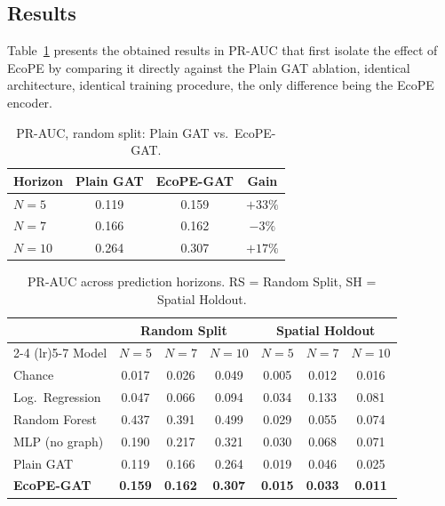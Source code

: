 \documentclass[a4paper,fleqn]{cas-sc}
\begin{document}
\subsection{Results}
\label{sec:results}

Table~\ref{tab:ecope-contribution} presents the obtained results in PR-AUC that first isolate the effect of EcoPE by comparing it directly against the Plain GAT ablation, identical architecture, identical training procedure, the only difference being the EcoPE encoder.

\begin{table}[t]
\centering
\caption{PR-AUC, random split: Plain GAT vs.\ EcoPE-GAT.}
\label{tab:ecope-contribution}
\begin{tabular}{lccc}
\toprule
Horizon & Plain GAT & EcoPE-GAT & Gain \\
\midrule
$N=5$  & 0.119 & 0.159 & $+33\%$ \\
$N=7$  & 0.166 & 0.162 & $-3\%$ \\
$N=10$ & 0.264 & 0.307 & $+17\%$ \\
\bottomrule
\end{tabular}
\end{table}

\begin{table}[t]
\centering
\caption{PR-AUC across prediction horizons. RS = Random Split, SH = Spatial Holdout.}
\label{tab:main-results}
\small
\begin{tabular}{lcccccc}
\toprule
 & \multicolumn{3}{c}{Random Split} & \multicolumn{3}{c}{Spatial Holdout} \\
\cmidrule(lr){2-4} \cmidrule(lr){5-7}
Model & $N=5$ & $N=7$ & $N=10$ & $N=5$ & $N=7$ & $N=10$ \\
\midrule
Chance              & 0.017 & 0.026 & 0.049 & 0.005 & 0.012 & 0.016 \\
Log.\ Regression    & 0.047 & 0.066 & 0.094 & 0.034 & 0.133 & 0.081 \\
Random Forest       & 0.437 & 0.391 & 0.499 & 0.029 & 0.055 & 0.074 \\
MLP (no graph)      & 0.190 & 0.217 & 0.321 & 0.030 & 0.068 & 0.071 \\
Plain GAT           & 0.119 & 0.166 & 0.264 & 0.019 & 0.046 & 0.025 \\
\textbf{EcoPE-GAT}  & \textbf{0.159} & \textbf{0.162} & \textbf{0.307} & \textbf{0.015} & \textbf{0.033} & \textbf{0.011} \\
\bottomrule
\end{tabular}
\end{table}
\end{document}
